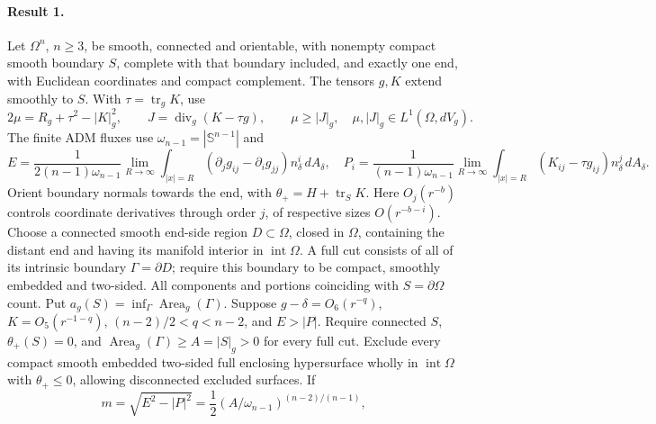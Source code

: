 \documentclass[11pt]{article}
\begin{document}
\paragraph{Result 1.} Let $\Omega^n$, $n\ge3$, be smooth, connected and orientable, with nonempty compact smooth boundary $S$, complete with that boundary included, and exactly one end, with Euclidean coordinates and compact complement. The tensors $g,K$ extend smoothly to $S$. With $\tau=\operatorname{tr}_gK$, use
\[
 2\mu=R_g+\tau^2-|K|_g^2,\qquad J=\operatorname{div}_g(K-\tau g),\qquad
 \mu\ge|J|_g,\quad\mu,|J|_g\in L^1(\Omega,dV_g).
\]
The finite ADM fluxes use $\omega_{n-1}=|\mathbb S^{n-1}|$ and
\[
 E=\frac1{2(n-1)\omega_{n-1}}\lim_{R\to\infty}\int_{|x|=R}
 (\partial_jg_{ij}-\partial_ig_{jj})n_\delta^i\,dA_\delta,\quad
 P_i=\frac1{(n-1)\omega_{n-1}}\lim_{R\to\infty}\int_{|x|=R}(K_{ij}-\tau g_{ij})n_\delta^j\,dA_\delta.
\]
Orient boundary normals towards the end, with $\theta_+=H+\operatorname{tr}_SK$. Here $O_j(r^{-b})$ controls coordinate derivatives through order $j$, of respective sizes $O(r^{-b-i})$. Choose a connected smooth end-side region $D\subset\Omega$, closed in $\Omega$, containing the distant end and having its manifold interior in $\operatorname{int}\Omega$. A full cut consists of all of its intrinsic boundary $\Gamma=\partial D$; require this boundary to be compact, smoothly embedded and two-sided. All components and portions coinciding with $S=\partial\Omega$ count. Put $a_g(S)=\inf_\Gamma\operatorname{Area}_g(\Gamma)$. Suppose $g-\delta=O_6(r^{-q})$, $K=O_5(r^{-1-q})$, $(n-2)/2<q<n-2$, and $E>|P|$. Require connected $S$, $\theta_+(S)=0$, and $\operatorname{Area}_g(\Gamma)\ge A=|S|_g>0$ for every full cut. Exclude every compact smooth embedded two-sided full enclosing hypersurface wholly in $\operatorname{int}\Omega$ with $\theta_+\le0$, allowing disconnected excluded surfaces. If
\[
 m=\sqrt{E^2-|P|^2}=\frac12(A/\omega_{n-1})^{(n-2)/(n-1)},
\]
\end{document}
